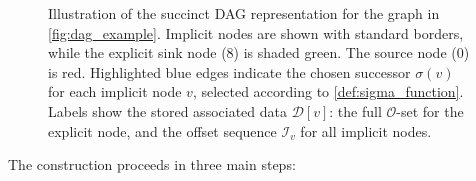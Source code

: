 \begin{figure}[htbp]
    \caption{Illustration of the succinct DAG representation for the graph in \autoref{fig:dag_example}. Implicit nodes are shown with standard borders, while the explicit sink node (8) is shaded green. The source node (0) is red. Highlighted blue edges indicate the chosen successor $\sigma(v)$ for each implicit node $v$, selected according to \ref{def:sigma_function}. Labels show the stored associated data $\mathcal{D}[v]$: the full $\mathcal{O}$-set for the explicit node, and the offset sequence $\mathcal{I}_v$ for all implicit nodes.}
    \label{fig:succinct_dag_example}
\end{figure}

The construction proceeds in three main steps:


